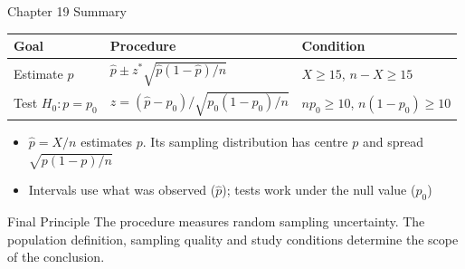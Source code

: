 \documentclass[aspectratio=169,10pt]{beamer}
\begin{document}
\begin{frame}{Chapter 19 Summary}
\begin{center}
\begin{tabularx}{0.95\textwidth}{>{\RaggedRight\arraybackslash}p{} >{\RaggedRight\arraybackslash}p{} X}
\toprule
\textbf{Goal} & \textbf{Procedure} & \textbf{Condition} \\
\midrule
Estimate $p$ & $\hat{p}\pm z^*\sqrt{\hat{p}(1-\hat{p})/n}$ & $X\ge15$, $n-X\ge15$ \\[0.15cm]
Test $H_0:p=p_0$ & $z=(\hat{p}-p_0)/\sqrt{p_0(1-p_0)/n}$ & $np_0\ge10$, $n(1-p_0)\ge10$ \\
\bottomrule
\end{tabularx}
\end{center}

\vspace{0.3cm}
\begin{itemize}
  \setlength{\itemsep}{0.12cm}
  \item $\hat{p}=X/n$ estimates $p$. Its sampling distribution has centre $p$ and spread $\sqrt{p(1-p)/n}$
  \item Intervals use what was observed ($\hat{p}$); tests work under the null value ($p_0$)
\end{itemize}

\vspace{0.2cm}
\begin{block}{Final Principle}
The procedure measures random sampling uncertainty. The population definition, sampling quality and study conditions determine the scope of the conclusion.
\end{block}
\end{frame}
\end{document}
